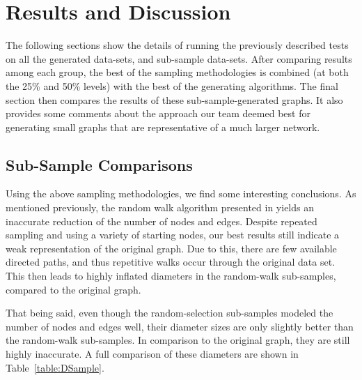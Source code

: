 \documentclass[pdftex,11pt,a4paper,twocolumn]{scrartcl}
\begin{document}
\section{Results and Discussion}
The following sections show the details of running the previously described tests on all the generated data-sets, and sub-sample data-sets. After comparing results among each group, the best of the sampling methodologies is combined (at both the 25\% and 50\% levels) with the best of the generating algorithms. The final section then compares the results of these sub-sample-generated graphs. It also provides some comments about the approach our team deemed best for generating small graphs that are representative of a much larger network. 

\subsection{Sub-Sample Comparisons}
\label{sec:subSampleComp}
Using the above sampling methodologies, we find some interesting conclusions. As mentioned previously, the random walk algorithm presented in \cite{sampling} yields an inaccurate reduction of the number of nodes and edges. Despite repeated sampling and using a variety of starting nodes, our best results still indicate a weak representation of the original graph. Due to this, there are few available directed paths, and thus repetitive walks occur through the original data set. This then leads to highly inflated diameters in the random-walk sub-samples, compared to the original graph. 

That being said, even though the random-selection sub-samples modeled the number of nodes and edges well, their diameter sizes are only slightly better than the random-walk sub-samples. In comparison to the original graph, they are still highly inaccurate. A full comparison of these diameters are shown in Table~\ref{table:DSample}. 

\begin{table}[h]
\centering
{}
\caption{Diameters of Sub-Sampled Graphs}
\label{table:DSample}
\end{table}
\end{document}
